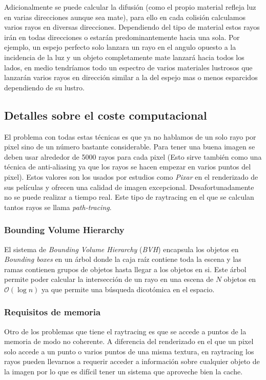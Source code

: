 \begin{pregunta}
Adicionalmente se puede calcular la difusión (como el propio material refleja
luz en varias direcciones aunque sea mate), para ello en cada colisión
calculamos varios rayos en diversas direcciones. Dependiendo del tipo de
material estos rayos irán en todas direcciones o estarán predominantemente hacia
una sola. Por ejemplo, un espejo perfecto solo lanzara un rayo en el angulo
opuesto a la incidencia de la luz y un objeto completamente mate lanzará hacia
todos los lados, en medio tendríamos todo un espectro de varios materiales
lustrosos que lanzarán varios rayos en dirección similar a la del espejo mas o
menos esparcidos dependiendo de su lustro.


\subsection*{Detalles sobre el coste computacional}

El problema con todas estas técnicas es que ya no hablamos de un solo rayo por
pixel sino de un número bastante considerable. Para tener una buena imagen se
deben usar alrededor de 5000 rayos para cada pixel (Esto sirve también como una
técnica de anti-aliasing ya que los rayos se hacen empezar en varios puntos del
pixel). Estos valores son los usados por estudios como \emph{Pixar} en el
renderizado de sus películas y ofrecen una calidad de imagen excepcional.
Desafortunadamente no se puede realizar a tiempo real. Este tipo de raytracing
en el que se calculan tantos rayos se llama \emph{path-tracing}.

\subsubsection*{Bounding Volume Hierarchy}

El sistema de \emph{Bounding Volume Hierarchy} (\emph{BVH}) encapsula los
objetos en \emph{Bounding boxes} en un árbol donde la caja raíz contiene toda
la escena y las ramas contienen grupos de objetos hasta llegar a los objetos en
si. Este árbol permite poder calcular la intersección de un rayo en una escena
de $N$ objetos en $\mathcal{O}(\log{}n)$ ya que permite una búsqueda dicotómica
en el espacio.

\subsubsection*{Requisitos de memoria}

Otro de los problemas que tiene el raytracing es que se accede a puntos de la
memoria de modo no coherente. A diferencia del renderizado en el que un pixel
solo accede a un punto o varios puntos de una misma textura, en raytracing los
rayos pueden llevarnos a requerir acceder a información sobre cualquier objeto
de la imagen por lo que es difícil tener un sistema que aproveche bien la cache.



\end{pregunta}
